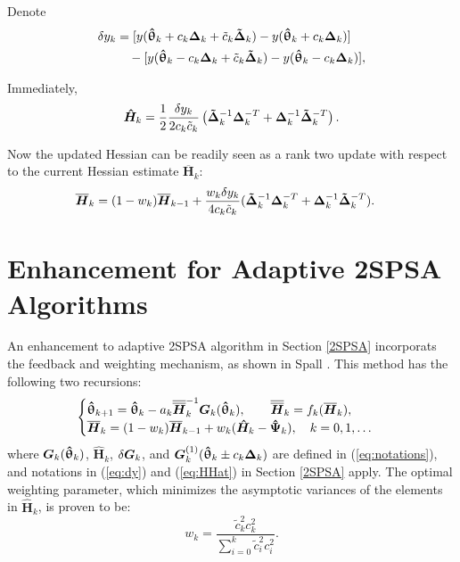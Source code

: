 \documentclass[conference]{IEEEtran} \ifCLASSINFOpdf
\newcommand{\oH}{\bm{\overline{H}}}
\newcommand{\ooH}{\bm{\overline{\overline{H}}}}
\newcommand{\hH}{\bm{\hat{H}}} \newcommand{\hPsi}{\bm{\hat{\Psi}}}
\newcommand{\htheta}{\bm{\hat{\uptheta}}}
\newcommand{\tDelta}{\bm{\tilde{\Delta}}}
\begin{document}
Denote
\begin{align} \label{eq:dy}
  \begin{split} \delta
    y_k&=[y(\htheta_k+c_k\bDelta_k+\tilde{c}_k\tDelta_k)-y(\htheta_k+c_k\bDelta_k)]\\
    &\quad-[y(\htheta_k-c_k\bDelta_k+\tilde{c}_k\tDelta_k)-y(\htheta_k-c_k\bDelta_k)],
  \end{split}
\end{align}

Immediately,
\begin{equation} \label{eq:HHat} \hH_k=\frac{1}{2}\frac{\delta
    y_k}{2c_k\tilde{c}_k}\left(
    \tDelta_k^{-1}\bDelta_k^{-T}+\bDelta_k^{-1}\tDelta_k^{-T} \right).
\end{equation}

Now the updated Hessian can be readily seen as a rank two
update with respect to the current Hessian estimate $\oH_k$:
\begin{align*}
\oH_k &= (1 - w_k)\oH_{k-1} + \frac{w_k \delta y_k}{4c_k\tilde{c}_k} (\tDelta_k^{-1}\bDelta_k^{-T}+\bDelta_k^{-1}\tDelta_k^{-T}).
\end{align*}


\section{Enhancement for Adaptive 2SPSA Algorithms}
\label{Enhanced 2SPSA}
An enhancement to adaptive 2SPSA
algorithm in Section \ref{2SPSA} incorporats the feedback and
weighting mechanism, as shown in Spall \cite{Spall2009}. This method
has the following two recursions:
\begin{equation} \label{eq:Enhancement}
  \begin{cases} \htheta_{k+1}=\htheta_k-a_k\ooH_k^{-1} \bG_k(\htheta_k),
    \qquad \bm{\ooH}_k=f_k(\oH_k),\\
    \oH_k=(1-w_k)\oH_{k-1}+w_k(\hH_k-\hPsi_k),
    \quad k=0,1,\dots
  \end{cases}
\end{equation}
where $\bG_k(\htheta_k)$, $\hH_k$,
$\delta\bm{G}_k$, and $\bG_k^{(1)}(\htheta_k\pm c_k\bDelta_k)$ are
defined in (\ref{eq:notations}), and notations in (\ref{eq:dy}) and
(\ref{eq:HHat}) in Section \ref{2SPSA} apply. The optimal weighting
parameter, which minimizes the asymptotic variances of the elements in
$\hH_k$, is proven to be:
\begin{equation} \label{eq:weighting}
  w_k=\frac{\tilde{c}_k^2c_k^2}{\sum_{i=0}^{k}\tilde{c}_i^2c_i^2}.
\end{equation}
\end{document}
